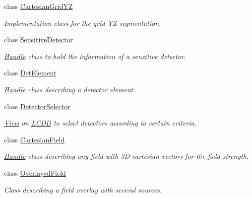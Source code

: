 \begin{DoxyCompactItemize}
class \hyperlink{class_d_d4hep_1_1_geometry_1_1_cartesian_grid_y_z}{CartesianGridYZ}
\begin{DoxyCompactList}\small\item\em Implementation class for the grid YZ segmentation. \item\end{DoxyCompactList}\item 
class \hyperlink{class_d_d4hep_1_1_geometry_1_1_sensitive_detector}{SensitiveDetector}
\begin{DoxyCompactList}\small\item\em \hyperlink{class_d_d4hep_1_1_handle}{Handle} class to hold the information of a sensitive detector. \item\end{DoxyCompactList}\item 
class \hyperlink{class_d_d4hep_1_1_geometry_1_1_det_element}{DetElement}
\begin{DoxyCompactList}\small\item\em \hyperlink{class_d_d4hep_1_1_handle}{Handle} class describing a detector element. \item\end{DoxyCompactList}\item 
class \hyperlink{class_d_d4hep_1_1_geometry_1_1_detector_selector}{DetectorSelector}
\begin{DoxyCompactList}\small\item\em \hyperlink{class_d_d4hep_1_1_view}{View} on \hyperlink{class_d_d4hep_1_1_geometry_1_1_l_c_d_d}{LCDD} to select detectors according to certain criteria. \item\end{DoxyCompactList}\item 
class \hyperlink{class_d_d4hep_1_1_geometry_1_1_cartesian_field}{CartesianField}
\begin{DoxyCompactList}\small\item\em \hyperlink{class_d_d4hep_1_1_handle}{Handle} class describing any field with 3D cartesian vectors for the field strength. \item\end{DoxyCompactList}\item 
class \hyperlink{class_d_d4hep_1_1_geometry_1_1_overlayed_field}{OverlayedField}
\begin{DoxyCompactList}\small\item\em Class describing a field overlay with several sources. \item\end{DoxyCompactList}\item 

\end{DoxyCompactItemize}
